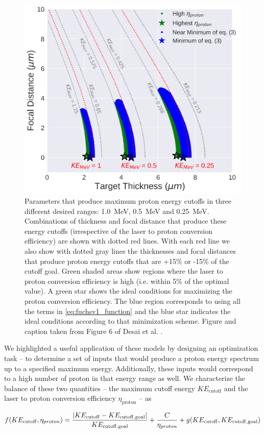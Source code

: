 \begin{figure}
	\centering 
	\includegraphics[width=0.75\linewidth]{planning/images/paper1/fuchs_optim.pdf}
	\caption{Parameters that produce maximum proton energy cutoffs in three different desired ranges: 1.0~MeV, 0.5~MeV and 0.25~MeV. Combinations of thickness and focal distance that produce these energy cutoffs (irrespective of the laser to proton conversion efficiency) are shown with dotted red lines. With each red line we also show with dotted gray lines the thicknesses and focal distances that produce proton energy cutoffs that are +15\% or -15\% of the cutoff goal. Green shaded areas show regions where the laser to proton conversion efficiency is high (i.e. within 5\% of the optimal value). A green star shows the ideal conditions for maximizing the proton conversion efficiency. The blue region corresponds to using all the terms in \autoref{eq:fuchsv1_function} and the blue star indicates the ideal conditions according to that minimization scheme. Figure and caption taken from Figure 6 of Desai et al. \cite{Desai_2024_CPP}.}
	\label{fig:banana}
\end{figure}

We highlighted a useful application of these models by designing an optimization task -- to determine a set of inputs that would produce a proton energy spectrum up to a specified maximum energy. Additionally, these inputs would correspond to a high number of proton in that energy range as well. We characterize the balance of these two quantities -- the maximum cutoff energy $KE_\text{cutoff}$ and the laser to proton conversion efficiency $\eta_\text{proton}$ -- as 

\begin{equation}
	f(KE_{\rm cutoff},\eta_{proton}) = \frac{|KE_{\rm cutoff} - KE_{\rm cutoff,goal}|}{KE_{\rm cutoff, goal}} + \frac{C}{\eta_{proton}} + g( KE_{\rm cutoff},KE_{\rm cutoff,goal})  \\ \label{eq:fuchsv1_function}
\end{equation}


